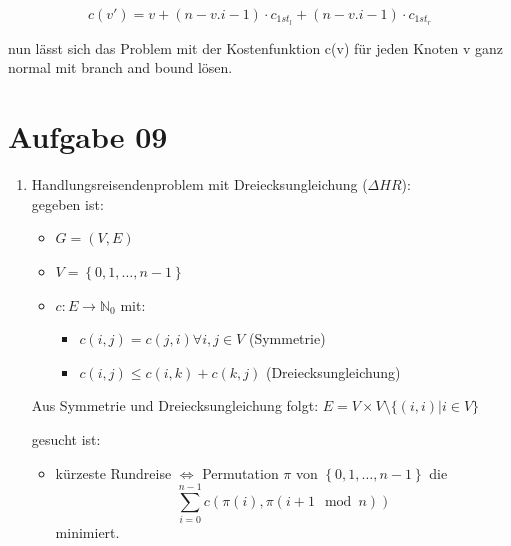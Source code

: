 \documentclass[10pt,a4paper]{article}
\begin{document}
    $$
        c(v') = v + (n-v.i-1) \cdot c_{1st_l} + (n-v.i-1) \cdot c_{1st_r}
    $$

    nun l\"asst sich das Problem mit der Kostenfunktion c(v) f\"ur jeden
    Knoten v ganz normal mit branch and bound l\"osen.




\section*{Aufgabe 09}
    \begin{enumerate}[label={\alph*)}]
        \item Handlungsreisendenproblem mit Dreiecksungleichung ($\Delta HR$): \\
            gegeben ist:
            \begin{itemize}
                \item $G = (V,E)$
                \item $V = \left\{0,1,\ldots, n-1\right\}$
                \item $c: E \rightarrow \mathbb{N}_0 $ mit:
                    \begin{itemize}
                        \item $c(i,j) = c(j,i) \forall i,j \in V$ (Symmetrie)
                        \item $c(i,j) \leq c(i,k) + c(k,j)$ (Dreiecksungleichung)
                    \end{itemize}

            \end{itemize}

            Aus Symmetrie und Dreiecksungleichung folgt: $E = V \times V
            \setminus \{ (i,i) | i \in V \} $

            gesucht ist:
            \begin{itemize}
                \item kürzeste Rundreise $\Leftrightarrow$
                    Permutation $\pi$ von $\left\{0,1,\ldots, n-1\right\}$ die
                    $$
                        \sum_{i=0}^{n-1} c(\pi(i), \pi(i+1 \mod n))
                    $$
                    minimiert.
            \end{itemize}


\end{enumerate}
\end{document}
